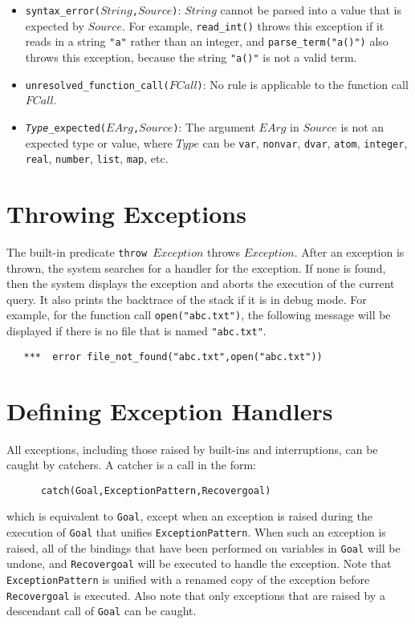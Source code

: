 \begin{itemize}
\item \texttt{syntax\_error($String$,$Source$)}: $String$ cannot be parsed into a value that is expected by $Source$. For example, \texttt{read\_int()} throws this exception if it reads in a string \texttt{"a"} rather than an integer, and \texttt{parse\_term("a()")} also throws this exception, because the string \texttt{"a()"} is not a valid term.
\item \texttt{unresolved\_function\_call($FCall$)}: No rule is applicable to the function call $FCall$.
\item \texttt{\emph{Type}\_expected($EArg$,$Source$)}: The argument $EArg$ in $Source$ is not an expected type or value, where $Type$ can be \texttt{var}, \texttt{nonvar}, \texttt{dvar}, \texttt{atom}, \texttt{integer}, \texttt{real}, \texttt{number}, \texttt{list}, \texttt{map}, etc.
\end{itemize}

\section{Throwing Exceptions}
The built-in predicate \texttt{throw $Exception$}  throws $Exception$. After an exception is thrown, the system searches for a handler for the exception. If none is found, then the system displays the exception and aborts the execution of the current query. It also prints the backtrace of the stack if it is in debug mode. For example, for the function call \texttt{open("abc.txt")}, the following message will be displayed if there is no file that is named \texttt{"abc.txt"}.
\begin{verbatim}
   ***  error file_not_found("abc.txt",open("abc.txt"))
\end{verbatim}

\section{Defining Exception Handlers}
All exceptions, including those raised by built-ins and interruptions, can be caught by catchers. A catcher is a call in the form:
\begin{verbatim}
      catch(Goal,ExceptionPattern,Recovergoal)
\end{verbatim}
which is equivalent to \texttt{Goal}, except when an exception is raised during the execution of \texttt{Goal} that unifies \texttt{ExceptionPattern}. When such an exception is raised, all of the bindings that have been performed on variables in \texttt{Goal} will be undone, and \texttt{Recovergoal} will be executed to handle the exception. Note that \texttt{ExceptionPattern} is unified with a renamed copy of the exception before \texttt{Recovergoal} is executed. Also note that only exceptions that are raised by a descendant call of \texttt{Goal} can be caught.

